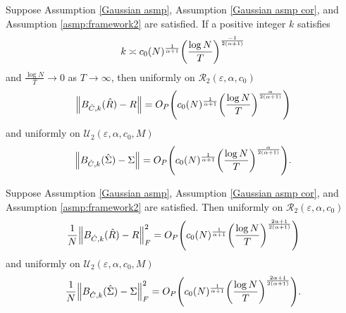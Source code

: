 \begin{thm}
    Suppose Assumption \autoref{Gaussian asmp}, Assumption \autoref{Gaussian asmp cor}, and Assumption \ref{asmp:framework2} are satisfied. If a positive integer $k$ satisfies
    \begin{equation} 
    	k \asymp c_0(N)^\frac{1}{\alpha+1}  \pqty{ \frac{\log N}{T} }^\frac{-1}{2(\alpha+1)}  
    	\label{k_NT}
    \end{equation}
    and $\frac{\log N}{T} \to 0$ as $T \to \infty$, then uniformly on $\mathcal R_2(\varepsilon, \alpha, c_0)$ 
    \begin{equation}
        \norm{ B_{\hat C, k} (\hat R) - R} = 
        O_P \pqty{ 
        c_0(N)^{\frac{1}{\alpha+1}}
        \pqty{\frac{\log N}{T}}^\frac{\alpha}{2(\alpha+1)}  
        }
        \label{theorem2_R_rate}
    \end{equation}
    and uniformly on $\mathcal U_2(\varepsilon, \alpha, c_0, M)$ 
    \begin{equation}
        \norm{ B_{\hat C, k} (\hat \Sigma) - \Sigma} = 
        O_P \pqty{ 
        c_0(N)^{\frac{1}{\alpha+1}}
        \pqty{\frac{\log N}{T}}^\frac{\alpha}{2(\alpha+1)}  
        }.
        \label{theorem2_S_rate}
    \end{equation}
    \label{theorem2}
\end{thm}

\begin{thm}
    Suppose Assumption \autoref{Gaussian asmp}, Assumption \autoref{Gaussian asmp cor}, and Assumption \ref{asmp:framework2} are satisfied. Then uniformly on $\mathcal R_2(\varepsilon, \alpha, c_0)$ 
    \begin{equation}
        \frac{1}{N} \norm{B_{\hat C, k} (\hat R) - R}_F^2 = 
        O_P \pqty{ 
        c_0(N)^{\frac{1}{\alpha+1}}
        \pqty{\frac{\log N}{T}}^\frac{2\alpha+1}{2(\alpha+1)}  
        }
        \label{theorem3_R_rate}
    \end{equation}
    and uniformly on $\mathcal U_2(\varepsilon, \alpha, c_0, M)$ 
    \begin{equation}
        \frac{1}{N} \norm{ B_{\hat C, k} (\hat \Sigma) - \Sigma}_F^2 = 
        O_P \pqty{ 
        c_0(N)^{\frac{1}{\alpha+1}}
        \pqty{\frac{\log N}{T}}^\frac{2\alpha+1}{2(\alpha+1)}  
        }.
        \label{theorem3_S_rate}
    \end{equation}
    \label{theorem3}
\end{thm}

